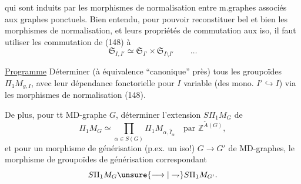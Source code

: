 qui sont induits par les morphismes de normalisation entre m.graphes associés aux graphes ponctuels. Bien entendu, pour pouvoir reconstituer bel et bien les  morphismes de normalisation, et leurs propriétés de commutation aux iso, il faut utiliser les  commutation de (148) à
\[
\mathfrak S_{I,I'}\simeq\mathfrak S_{I'}\times\mathfrak S_{I\setminus I'}\qquad\ldots
\]

\uline{Programme} Déterminer (à équivalence ``canonique'' près) tous les groupoïdes $\Pi_1M_{g,I}$, avec leur dépendance fonctorielle pour  $I$ variable (des mono. $I'\hookrightarrow I$) via les morphismes de normalisation (148).

De plus, pour tt MD-graphe $G$, déterminer l'extension $S\Pi_1M_G$ de
\[
\Pi_1M_G\simeq\prod_{\alpha\in S(G)}\Pi_1M_{\alpha,\widehat I_\alpha}\quad\text{par }\mathbb Z^{\widetilde A(G)},
\]
et pour un morphisme de générisation (p.ex. un iso!)  $G\longrightarrow G'$ de MD-graphes,  le morphisme de groupoïdes de générisation correspondant
\[
S\Pi_1M_G\unsure{\longrightarrow|\rightharpoondown}S\Pi_1M_{G'}.
\]
